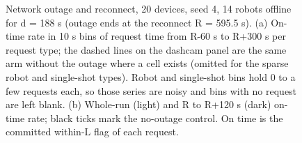 \documentclass[sigconf]{acmart}
\begin{document}
{\selectfont
\begin{figure}[t]
  \centering
  
  \caption{Network outage and reconnect, 20 devices, seed 4, 14 robots offline for d = 188 s (outage ends at the reconnect R = 595.5 s). (a) On-time rate in 10 s bins of request time from R-60 s to R+300 s per request type; the dashed lines on the dashcam panel are the same arm without the outage where a cell exists (omitted for the sparse robot and single-shot types). Robot and single-shot bins hold 0 to a few requests each, so those series are noisy and bins with no request are left blank. (b) Whole-run (light) and R to R+120 s (dark) on-time rate; black ticks mark the no-outage control. On time is the committed within-L flag of each request.}
  \label{fig:F12_network}
\end{figure}
}


\end{document}
